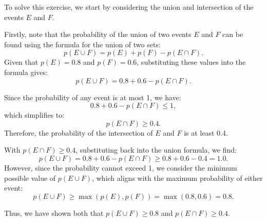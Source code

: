         \begin{solution}
            To solve this exercise, we start by considering the union and intersection of the events \(E\) and \(F\). 
        
            Firstly, note that the probability of the union of two events \(E\) and \(F\) can be found using the formula for the union of two sets:
            \[
                p(E \cup F) = p(E) + p(F) - p(E \cap F).
            \]
            Given that \(p(E) = 0.8\) and \(p(F) = 0.6\), substituting these values into the formula gives:
            \[
                p(E \cup F) = 0.8 + 0.6 - p(E \cap F).
            \]
        
            Since the probability of any event is at most 1, we have:
            \[
                0.8 + 0.6 - p(E \cap F) \leq 1,
            \]
            which simplifies to:
            \[
                p(E \cap F) \geq 0.4.
            \]
            Therefore, the probability of the intersection of \(E\) and \(F\) is at least 0.4.
        
            With \(p(E \cap F) \geq 0.4\), substituting back into the union formula, we find:
            \[
                p(E \cup F) = 0.8 + 0.6 - p(E \cap F) \geq 0.8 + 0.6 - 0.4 = 1.0.
            \]
            However, since the probability cannot exceed 1, we consider the minimum possible value of \(p(E \cup F)\), which aligns with the maximum probability of either event:
            \[
                p(E \cup F) \geq \max(p(E), p(F)) = \max(0.8, 0.6) = 0.8.
            \]
        
            Thus, we have shown both that \(p(E \cup F) \geq 0.8\) and \(p(E \cap F) \geq 0.4\).
        \end{solution}

